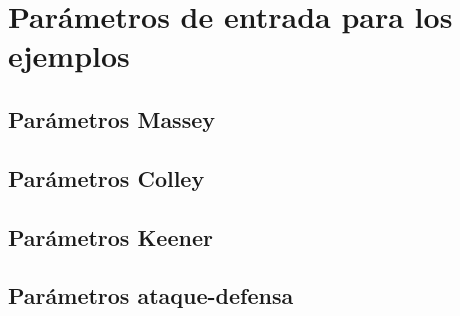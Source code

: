 \fbox{\parbox[b]{\linewidth}{
					
}}

\newpage

\section{Parámetros de entrada para los ejemplos}

\subsection*{Parámetros Massey}

\fbox{\parbox[b]{\linewidth}{
					
}}
	
\newpage	
	
\subsection*{Parámetros Colley}

\fbox{\parbox[b]{\linewidth}{
					
}}

\newpage

\subsection*{Parámetros Keener}

\fbox{\parbox[b]{\linewidth}{
					
}}

\newpage

\subsection*{Parámetros ataque-defensa}

\fbox{\parbox[b]{\linewidth}{
					
}}